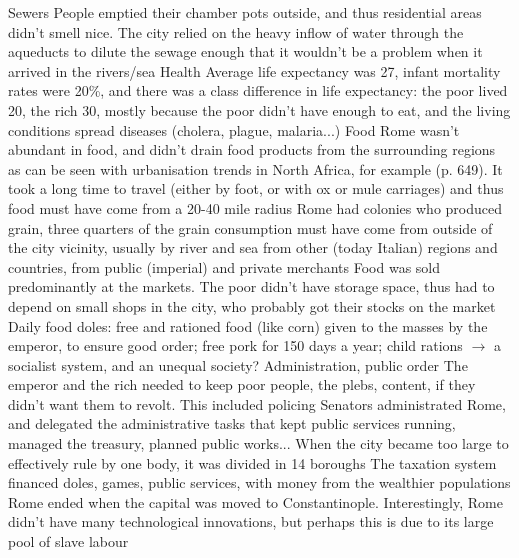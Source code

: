 \documentclass{article}
\begin{document}
\begin{outline}
	\1 Sewers
		\2 People emptied their chamber pots outside, and thus residential areas didn't smell nice. The city relied on the heavy inflow of water through the aqueducts to dilute the sewage enough that it wouldn't be a problem when it arrived in the rivers/sea
	\1 Health
		\2 Average life expectancy was 27, infant mortality rates were 20\%, and there was a class difference in life expectancy: the poor lived 20, the rich 30, mostly because the poor didn't have enough to eat, and the living conditions spread diseases (cholera, plague, malaria...)
	\1 Food
		\2 Rome wasn't abundant in food, and didn't drain food products from the surrounding regions as can be seen with urbanisation trends in North Africa, for example (p. 649). It took a long time to travel (either by foot, or with ox or mule carriages) and thus food must have come from a 20-40 mile radius
		\2 Rome had colonies who produced grain, three quarters of the grain consumption must have come from outside of the city vicinity, usually by river and sea from other (today Italian) regions and countries, from public (imperial) and private merchants
		\2 Food was sold predominantly at the markets. The poor didn't have storage space, thus had to depend on small shops in the city, who probably got their stocks on the market
		\2 Daily food doles: free and rationed food (like corn) given to the masses by the emperor, to ensure good order; free pork for 150 days a year; child rations $\rightarrow$ a socialist system, and an unequal society?
	\1 Administration, public order
		\2 The emperor and the rich needed to keep poor people, the plebs, content, if they didn't want them to revolt. This included policing
		\2 Senators administrated Rome, and delegated the administrative tasks that kept public services running, managed the treasury, planned public works...
		\2 When the city became too large to effectively rule by one body, it was divided in 14 boroughs
		\2 The taxation system financed doles, games, public services, with money from the wealthier populations
	\1 Rome ended when the capital was moved to Constantinople. Interestingly, Rome didn't have many technological innovations, but perhaps this is due to its large pool of slave labour
\end{outline}

\subsection{}

\begin{outline}
	\1
\end{outline}
\end{document}
